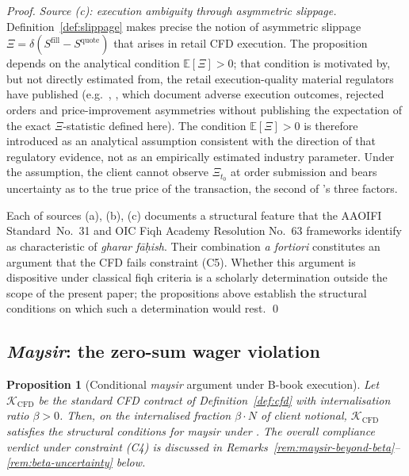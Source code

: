 \documentclass[preprint,12pt,authoryear]{elsarticle}
\newcommand{\EE}{\mathbb{E}}
\newtheorem{proposition}{Proposition}[section]
\theoremstyle{definition}
\begin{document}
\begin{proof}
\emph{Source (c): execution ambiguity through asymmetric slippage.}
Definition~\ref{def:slippage} makes precise the notion of
asymmetric slippage $\Xi = \delta(S^{\text{fill}} - S^{\text{quote}})$
that arises in retail CFD execution. The proposition depends on
the analytical condition $\EE[\Xi] > 0$; that condition is
motivated by, but not directly estimated from, the retail
execution-quality material regulators have published (e.g.\
\citealp{FCA2022}, \citealp{ESMA2018}, which document adverse
execution outcomes, rejected orders and price-improvement
asymmetries without publishing the expectation of the exact
$\Xi$-statistic defined here). The condition $\EE[\Xi] > 0$ is
therefore introduced as an analytical assumption consistent with
the direction of that regulatory evidence, not as an
empirically estimated industry parameter. Under the assumption,
the client cannot observe $\Xi_{t_0}$ at order submission and
bears uncertainty as to the true price of the
transaction, the second of \citet{Kamali2000}'s three
factors.

Each of sources (a), (b), (c) documents a structural feature that
the AAOIFI Standard~No.~31 and OIC Fiqh Academy Resolution No.~63
frameworks identify as characteristic of \emph{gharar
f\={a}\d{h}ish}. Their combination \emph{a fortiori} constitutes an
argument that the CFD fails constraint (C5). Whether this argument
is dispositive under classical fiqh criteria is a scholarly
determination outside the scope of the present paper; the
propositions above establish the structural conditions on which such
a determination would rest. \qed
\end{proof}

\subsection{\emph{Maysir}: the zero-sum wager violation}
\label{sec:maysir-analysis}

\begin{proposition}[Conditional \emph{maysir} argument under
    B-book execution]
\label{prop:maysir}
Let $\mathcal{K}_{\text{CFD}}$ be the standard CFD contract of
Definition~\ref{def:cfd} with internalisation ratio $\beta > 0$.
Then, on the internalised fraction $\beta \cdot N$ of client
notional, $\mathcal{K}_{\text{CFD}}$ satisfies the structural
conditions for \emph{maysir} under \citet{OICFiqh63}. The overall
compliance verdict under constraint (C4) is discussed in
Remarks~\ref{rem:maysir-beyond-beta}--\ref{rem:beta-uncertainty}
below.
\end{proposition}
\end{document}
